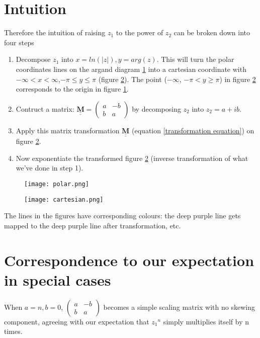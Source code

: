 \documentclass[a4paper, 12pt]{article}
\newcommand{\matr}[1]{\underline{\underline{\textbf{#1}}}}
\begin{document}
\section{Intuition}\label{Intuition}
Therefore the intuition of raising $z_1$ to the power of $z_2$ can be broken down into four steps
\begin{enumerate}
    \item Decompose $z_1$ into $x=ln(|z|), y=arg(z)$. This will turn the polar coordinates lines on the argand diagram \ref{polar} into a cartesian coordinate with $-\infty < x < \infty$,$ -\pi\le y\le \pi$ (figure \ref{cartesian}). The point ($-\infty$, $-\pi < y\ge\pi$) in figure \ref{cartesian} corresponds to the origin in figure \ref{polar}.
    \item Contruct a matrix:
    $\matr{M}=\begin{pmatrix}
    a & -b\\
    b & a
    \end{pmatrix}$ by decomposing $z_2$ into $z_2=a+ib$.
    \item Apply this matrix transformation $\matr{M}$ (equation \ref{transformation equation}) on figure \ref{cartesian}.
    \item Now exponentiate the transformed figure \ref{cartesian} (inverse transformation of what we've done in step 1).
\end{enumerate}

\begin{figure}[H]
    \centering
    \texttt{[image: polar.png]}
    \label{polar}
\end{figure}
\begin{figure}[H]
    \centering
    \texttt{[image: cartesian.png]}
    \label{cartesian}
\end{figure}
The lines in the figures have corresponding colours: the deep purple line gets mapped to the deep purple line after transformation, etc.

\section{Correspondence to our expectation in special cases}
When $a=n, b=0$, 
$\begin{pmatrix}
a & -b\\
b & a
\end{pmatrix}$ becomes a simple scaling matrix with no skewing component, agreeing with our expectation that ${z_1}^{n}$ simply multiplies itself by n times.
\end{document}
